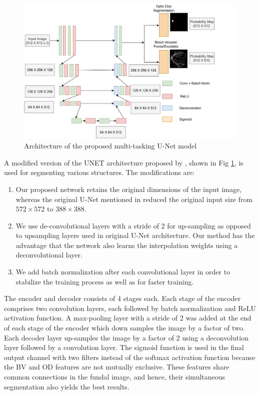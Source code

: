 \documentclass[utf8]{FrontiersinHarvard} %
\begin{document}
\begin{figure}
\centering
\includegraphics[width=0.9\linewidth]{images/UnetArch.jpg}
\caption{Architecture of the proposed multi-tasking U-Net model}
\label{unet_combined}
\end{figure}

A modified version of the UNET architecture proposed by \cite{ronneberger2015u}, shown in Fig \ref{unet_combined}, is used for segmenting various structures. The modifications are:
\begin{enumerate}
\item Our proposed network retains the original dimensions of the input image, whereas the original U-Net mentioned in \cite{ronneberger2015u} reduced the original  input size from $572 \times 572$ to $388 \times 388$.

\item We use de-convolutional layers with a stride of 2 for up-sampling as opposed to  upsampling layers used in original U-Net architecture. Our method has the advantage that the network also learns the interpolation weights using a deconvolutional layer.
\item We add batch normalization after each convolutional layer in order to stabilize the training process as well as for faster training.
\end{enumerate}

The encoder and decoder consists of 4 stages each. Each stage of the encoder comprises two convolution layers, each followed by batch normalization and ReLU activation function. A max-pooling layer with a stride of 2 was added at the end of each stage of the encoder which down samples the image by a factor of two.
Each decoder layer up-samples the image by a factor of 2 using  a deconvolution layer followed by a convolution layer. The sigmoid function is used in the final output channel with two filters instead of the softmax activation function because the BV and OD features are not  mutually exclusive. These features share common connections in the fundal image, and hence, their simultaneous segmentation also yields the best results.
\end{document}
